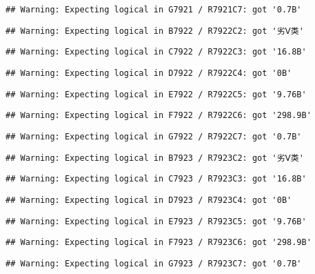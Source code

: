 \documentclass[
]{article}
\begin{document}
\begin{verbatim}
## Warning: Expecting logical in G7921 / R7921C7: got '0.7B'
\end{verbatim}

\begin{verbatim}
## Warning: Expecting logical in B7922 / R7922C2: got '劣Ⅴ类'
\end{verbatim}

\begin{verbatim}
## Warning: Expecting logical in C7922 / R7922C3: got '16.8B'
\end{verbatim}

\begin{verbatim}
## Warning: Expecting logical in D7922 / R7922C4: got '0B'
\end{verbatim}

\begin{verbatim}
## Warning: Expecting logical in E7922 / R7922C5: got '9.76B'
\end{verbatim}

\begin{verbatim}
## Warning: Expecting logical in F7922 / R7922C6: got '298.9B'
\end{verbatim}

\begin{verbatim}
## Warning: Expecting logical in G7922 / R7922C7: got '0.7B'
\end{verbatim}

\begin{verbatim}
## Warning: Expecting logical in B7923 / R7923C2: got '劣Ⅴ类'
\end{verbatim}

\begin{verbatim}
## Warning: Expecting logical in C7923 / R7923C3: got '16.8B'
\end{verbatim}

\begin{verbatim}
## Warning: Expecting logical in D7923 / R7923C4: got '0B'
\end{verbatim}

\begin{verbatim}
## Warning: Expecting logical in E7923 / R7923C5: got '9.76B'
\end{verbatim}

\begin{verbatim}
## Warning: Expecting logical in F7923 / R7923C6: got '298.9B'
\end{verbatim}

\begin{verbatim}
## Warning: Expecting logical in G7923 / R7923C7: got '0.7B'
\end{verbatim}
\end{document}
